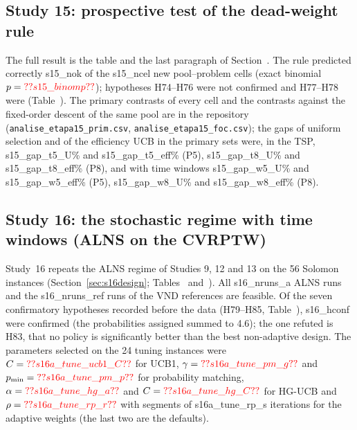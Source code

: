 \subsection{Study 15: prospective test of the dead-weight rule}\label{sec:s15}
The full result is the table and the last paragraph of Section~. The rule predicted correctly \num{s15_nok} of the \num{s15_ncel} new pool--problem cells (exact binomial $p=\num{s15_binomp}$); hypotheses H74--H76 were not confirmed and H77--H78 were (Table~). The primary contrasts of every cell and the contrasts against the fixed-order descent of the same pool are in the repository (\texttt{analise\_etapa15\_prim.csv}, \texttt{analise\_etapa15\_foc.csv}); the gaps of uniform selection and of the efficiency UCB in the primary sets were, in the TSP, \num{s15_gap_t5_U}\% and \num{s15_gap_t5_eff}\% (P5), \num{s15_gap_t8_U}\% and \num{s15_gap_t8_eff}\% (P8), and with time windows \num{s15_gap_w5_U}\% and \num{s15_gap_w5_eff}\% (P5), \num{s15_gap_w8_U}\% and \num{s15_gap_w8_eff}\% (P8).

\subsection{Study 16: the stochastic regime with time windows (ALNS on the CVRPTW)}\label{sec:s16}
Study~16 repeats the ALNS regime of Studies 9, 12 and 13 on the 56 Solomon instances (Section~\ref{sec:s16design}; Tables~ and~). All \num{s16_nruns_a} ALNS runs and the \num{s16_nruns_ref} runs of the VND references are feasible. Of the seven confirmatory hypotheses recorded before the data (H79--H85, Table~), \num{s16_hconf} were confirmed (the probabilities assigned summed to 4.6); the one refuted is H83, that no policy is significantly better than the best non-adaptive design. The parameters selected on the 24 tuning instances were $C=\num{s16a_tune_ucb1_C}$ for UCB1, $\gamma=\num{s16a_tune_pm_g}$ and $p_{\min}=\num{s16a_tune_pm_p}$ for probability matching, $\alpha=\num{s16a_tune_hg_a}$ and $C=\num{s16a_tune_hg_C}$ for HG-UCB and $\rho=\num{s16a_tune_rp_r}$ with segments of \num{s16a_tune_rp_s} iterations for the adaptive weights (the last two are the defaults).



